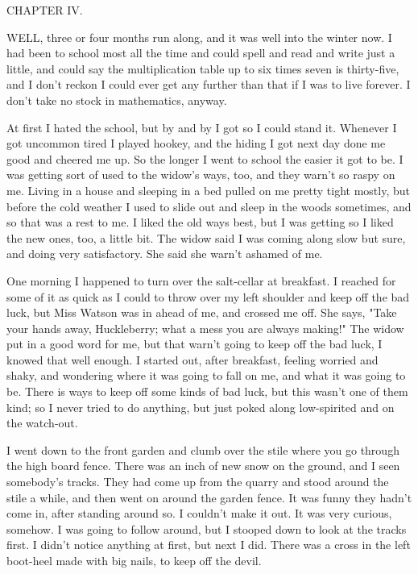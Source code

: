 CHAPTER IV.

WELL, three or four months run along, and it was well into the winter
now. I had been to school most all the time and could spell and read and
write just a little, and could say the multiplication table up to six
times seven is thirty-five, and I don't reckon I could ever get any
further than that if I was to live forever.  I don't take no stock in
mathematics, anyway.

At first I hated the school, but by and by I got so I could stand it.
Whenever I got uncommon tired I played hookey, and the hiding I got next
day done me good and cheered me up.  So the longer I went to school the
easier it got to be.  I was getting sort of used to the widow's ways,
too, and they warn't so raspy on me.  Living in a house and sleeping in a
bed pulled on me pretty tight mostly, but before the cold weather I used
to slide out and sleep in the woods sometimes, and so that was a rest to
me.  I liked the old ways best, but I was getting so I liked the new
ones, too, a little bit. The widow said I was coming along slow but sure,
and doing very satisfactory.  She said she warn't ashamed of me.

One morning I happened to turn over the salt-cellar at breakfast.  I
reached for some of it as quick as I could to throw over my left shoulder
and keep off the bad luck, but Miss Watson was in ahead of me, and
crossed me off. She says, "Take your hands away, Huckleberry; what a mess
you are always making!"  The widow put in a good word for me, but that
warn't going to keep off the bad luck, I knowed that well enough.  I
started out, after breakfast, feeling worried and shaky, and wondering
where it was going to fall on me, and what it was going to be.  There is
ways to keep off some kinds of bad luck, but this wasn't one of them
kind; so I never tried to do anything, but just poked along low-spirited
and on the watch-out.

I went down to the front garden and clumb over the stile where you go
through the high board fence.  There was an inch of new snow on the
ground, and I seen somebody's tracks.  They had come up from the quarry
and stood around the stile a while, and then went on around the garden
fence.  It was funny they hadn't come in, after standing around so.  I
couldn't make it out.  It was very curious, somehow.  I was going to
follow around, but I stooped down to look at the tracks first.  I didn't
notice anything at first, but next I did.  There was a cross in the left
boot-heel made with big nails, to keep off the devil.

